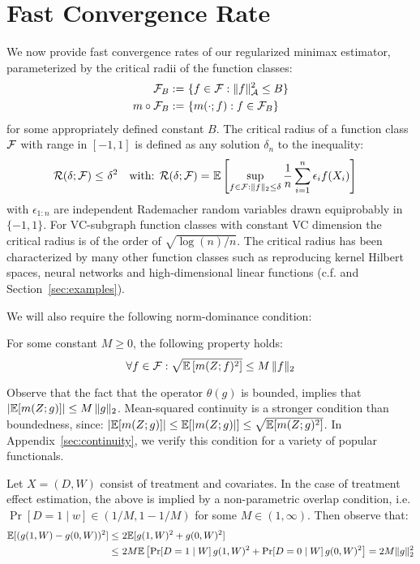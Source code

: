 
\section{Fast Convergence Rate}\label{sec:estimation}

We now provide fast convergence rates of our regularized minimax estimator, parameterized by the critical radii of the function classes:
\begin{align}
    {\mathcal F}_B:=~&\{f\in {\mathcal F}: \|f\|_{{\mathcal A}}^2\leq B\}\\
    m\circ {\mathcal F}_B:=~&\{m(\cdot; f): f\in {\mathcal F}_B\}
\end{align}
for some appropriately defined constant $B$. The critical radius of a function class ${\mathcal F}$ with range in $[-1, 1]$ is defined as any solution $\delta_n$ to the inequality:
\begin{align}
    {\cal R}(\delta; {\mathcal F})\leq~& \delta^2 &
    \text{with: } {\cal R}(\delta; {\mathcal F}) =~& \mathbb{E}\left[\sup_{f\in {\mathcal F}: \|f\|_2\leq \delta} \frac{1}{n} \sum_{i=1}^n \epsilon_i f(X_i)\right]
\end{align}
with $\epsilon_{1:n}$ are independent Rademacher random variables drawn equiprobably in $\{-1, 1\}$. For VC-subgraph function classes with constant VC dimension the critical radius is of the order of $\sqrt{\log(n)/n}$. The critical radius has been characterized by many other function classes such as reproducing kernel Hilbert spaces, neural networks and high-dimensional linear functions (c.f. \cite{wainwright2019high} and Section~\ref{sec:examples}).

We will also require the following norm-dominance condition:
\begin{assumption}\label{ass:strong-smooth}
For some constant $M\geq 0$, the following property holds:
\begin{equation}
    \forall f\in {\mathcal F}: \sqrt{\mathbb{E}\left[m(Z;f)^2\right]} \leq M\, \|f\|_2 
\end{equation}
\end{assumption}
Observe that the fact that the operator $\theta(g)$ is bounded, implies that $|\mathbb{E}[m(Z;g)]| \leq M\, \|g\|_2$. Mean-squared continuity is a stronger condition than boundedness, since: $|\mathbb{E}[m(Z;g)]|\leq \mathbb{E}[|m(Z;g)|] \leq \sqrt{\mathbb{E}[m(Z;g)^2]}$. In Appendix~\ref{sec:continuity}, we verify this condition for a variety of popular functionals.

\begin{example} Let $X=(D,W)$ consist of treatment and covariates. In the case of treatment effect estimation, the above is implied by a non-parametric overlap condition, i.e. $\Pr[D=1\mid w] \in (1/M, 1-1/M)$ for some $M\in (1, \infty)$. Then observe that:
\begin{align}
\mathbb{E}[(g(1, W) - g(0, W))^2]\leq~& 2\mathbb{E}[g(1,W)^2 + g(0, W)^2]\\
\leq~& 2M \mathbb{E}\left[\operatorname{Pr}[D=1\mid W]\, g(1,W)^2 + \operatorname{Pr}[D=0\mid W]\, g(0, W)^2\right] = 2M \|g\|_2^2
\end{align}
\end{example}

